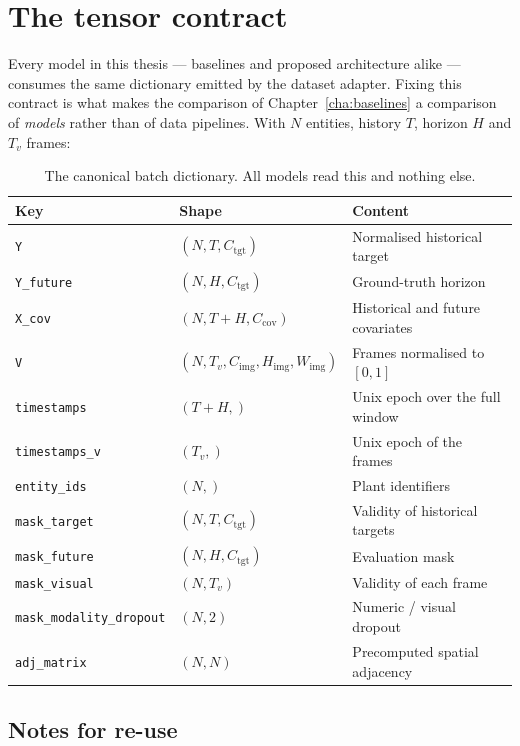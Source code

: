 \section{The tensor contract}
\label{sec:contract}

Every model in this thesis --- baselines and proposed architecture alike --- consumes the
same dictionary emitted by the dataset adapter. Fixing this contract is what makes the
comparison of Chapter~\ref{cha:baselines} a comparison of \emph{models} rather than of data
pipelines. With $N$ entities, history $T$, horizon $H$ and $T_v$ frames:

\begin{table}[h!]
\centering
\small
\begin{tabular}{l l l}
\hline
\textbf{Key} & \textbf{Shape} & \textbf{Content} \\
\hline
\texttt{Y} & $(N, T, C_{\text{tgt}})$ & Normalised historical target \\
\texttt{Y\_future} & $(N, H, C_{\text{tgt}})$ & Ground-truth horizon \\
\texttt{X\_cov} & $(N, T+H, C_{\text{cov}})$ & Historical and future covariates \\
\texttt{V} & $(N, T_v, C_{\text{img}}, H_{\text{img}}, W_{\text{img}})$ & Frames normalised
to $[0,1]$ \\
\texttt{timestamps} & $(T+H,)$ & Unix epoch over the full window \\
\texttt{timestamps\_v} & $(T_v,)$ & Unix epoch of the frames \\
\texttt{entity\_ids} & $(N,)$ & Plant identifiers \\
\texttt{mask\_target} & $(N, T, C_{\text{tgt}})$ & Validity of historical targets \\
\texttt{mask\_future} & $(N, H, C_{\text{tgt}})$ & Evaluation mask \\
\texttt{mask\_visual} & $(N, T_v)$ & Validity of each frame \\
\texttt{mask\_modality\_dropout} & $(N, 2)$ & Numeric / visual dropout \\
\texttt{adj\_matrix} & $(N, N)$ & Precomputed spatial adjacency \\
\hline
\end{tabular}
\caption{The canonical batch dictionary. All models read this and nothing else.}
\label{tab:contract}
\end{table}

\subsection{Notes for re-use}

